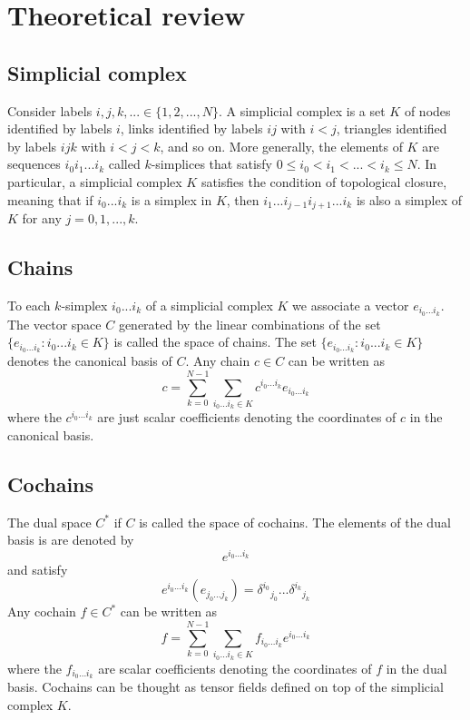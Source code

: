\documentclass[aps,prl,twocolumn,groupedaddress]{revtex4-2}
\begin{document}
\section{Theoretical review}

\subsection{Simplicial complex}

Consider labels $i,j,k,... \in \{1,2,...,N\}$.
A simplicial complex is a set $K$ of nodes identified by labels $i$, links identified by labels $ij$ with $i<j$, triangles identified by labels $ijk$ with $i<j<k$, and so on.
More generally, the elements of $K$ are sequences $i_0i_1...i_k$ called $k$-simplices that satisfy $0\leq i_0<i_1<...<i_k\leq N$.
In particular, a simplicial complex $K$ satisfies the condition of topological closure, meaning that if $i_0...i_k$ is a simplex in $K$, then $i_1...i_{j-1}i_{j+1}...i_k$ is also a simplex of $K$ for any $j=0,1,...,k$.

\subsection{Chains}

To each $k$-simplex $i_0...i_k$ of a simplicial complex $K$ we associate a vector $e_{i_0...i_k}$.
The vector space $C$ generated by the linear combinations of the set $\{e_{i_0...i_k}:i_0...i_k\in K\}$ is called the space of chains.
The set $\{e_{i_0...i_k}:i_0...i_k\in K\}$ denotes the canonical basis of $C$.
Any chain $c\in C$ can be written as
$$
c = 
\sum_{k=0}^{N-1}
\sum_{i_0...i_k \in K}
c^{i_0...i_k}
e_{i_0...i_k}
$$
where the $c^{i_0...i_k}$ are just scalar coefficients denoting the coordinates of $c$ in the canonical basis.

\subsection{Cochains}

The dual space $C^*$ if $C$ is called the space of cochains.
The elements of the dual basis is are denoted by
$$
e^{i_0...i_k}
$$
and satisfy
$$
e^{i_0...i_k}(e_{j_0...j_k})
=
\delta^{i_0}{}_{j_0}
...
\delta^{i_k}{}_{j_k}
$$
Any cochain $f\in C^*$ can be written as
$$
f = 
\sum_{k=0}^{N-1}
\sum_{i_0...i_k \in K}
f_{i_0...i_k}
e^{i_0...i_k}
$$
where the $f_{i_0...i_k}$ are scalar coefficients denoting the coordinates of $f$ in the dual basis.
Cochains can be thought as tensor fields defined on top of the simplicial complex $K$.
\end{document}
